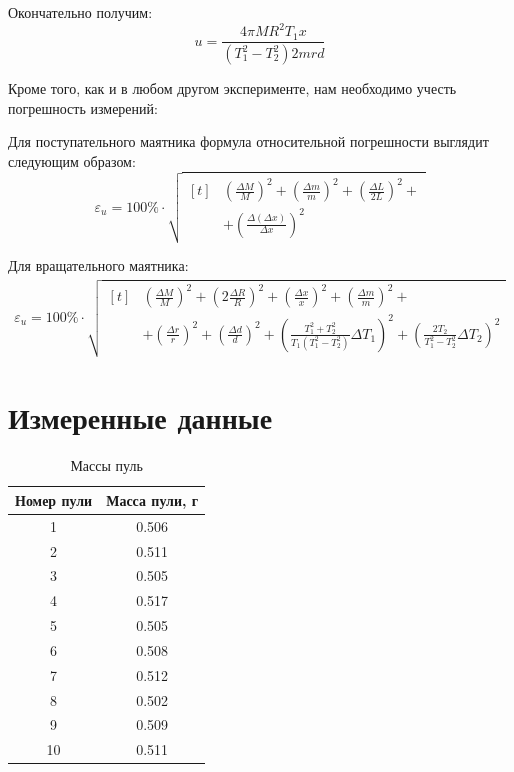 \documentclass[a4paper,12pt]{article}
\begin{document}
Окончательно получим:
\begin{equation}
    \label{eq:bullet_speed2}
    u = \frac{4\pi MR^2T_1x}{(T_1^2-T_2^2)2mrd}
\end{equation}

Кроме того, как и в любом другом эксперименте, нам необходимо учесть погрешность измерений:

Для поступательного маятника формула относительной погрешности выглядит следующим образом:
\begin{equation}
\varepsilon_u = 100\% \cdot \sqrt{ 
    \begin{aligned}[t]
        & \left(\frac{\Delta M}{M}\right)^2 + \left(\frac{\Delta m}{m}\right)^2 + \left(\frac{\Delta L}{2L}\right)^2 + {} \\
        & + \left(\frac{\Delta(\Delta x)}{\Delta x}\right)^2
    \end{aligned}
}
\end{equation}

Для вращательного маятника:
\begin{equation}
\begin{aligned}
\varepsilon_u = 100\% \cdot \sqrt{ 
    \begin{aligned}[t]
        & \left(\frac{\Delta M}{M}\right)^2 + \left(2\frac{\Delta R}{R}\right)^2 + \left(\frac{\Delta x}{x}\right)^2 + \left(\frac{\Delta m}{m}\right)^2 + {} \\
        & + \left(\frac{\Delta r}{r}\right)^2 + \left(\frac{\Delta d}{d}\right)^2 + \left(\frac{T_1^2 + T_2^2}{T_1(T_1^2 - T_2^2)} \Delta T_1\right)^2 + \left(\frac{2T_2}{T_1^2 - T_2^2} \Delta T_2\right)^2
    \end{aligned}
}
\end{aligned}
\end{equation}

\section{Измеренные данные}

\begin{table}[htbp]
    \centering
    \caption{Массы пуль}
    \label{tab:bullet_weights}
    \begin{tabular}{cc}
        \toprule
        Номер пули & Масса пули, г \\
        \midrule
        1 & 0.506 \\
        2 & 0.511 \\
        3 & 0.505 \\
        4 & 0.517 \\
        5 & 0.505 \\
        6 & 0.508 \\
        7 & 0.512 \\
        8 & 0.502 \\
        9 & 0.509 \\
        10 & 0.511 \\
        \bottomrule
    \end{tabular}
\end{table}
\end{document}

